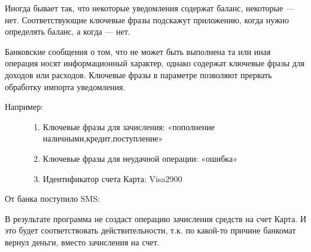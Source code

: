 \documentclass[a4paper,10pt,russian]{sphinxmanual}
\begin{document}
\noindent{}

\noindent{}

Иногда бывает так, что некоторые уведомления содержат баланс, некоторые — нет. Соответствующие ключевые фразы
подскажут приложению, когда нужно определять баланс, а когда — нет.

Банковские сообщения о том, что не может быть выполнена та или иная операция носят информационный характер,
однако содержат ключевые фразы для доходов или расходов. Ключевые фразы в параметре  позволяют
прервать обработку импорта уведомления.
\begin{description}
\item[{Например:}] \leavevmode\begin{enumerate}
\def\theenumi{\arabic{enumi}}
\def\labelenumi{\theenumi .}
\makeatletter\def\p@enumii{\p@enumi \theenumi .}\makeatother
\item {} 
Ключевые фразы для зачисления: «пополнение наличными,кредит,поступление»

\item {} 
Ключевые фразы для неудачной операции: «ошибка»

\item {} 
Идентификатор счета Карта: Visa2900

\end{enumerate}

\end{description}

От банка поступило SMS:

\begin{sphinxVerbatim}[commandchars=\\\{\}]
           
\end{sphinxVerbatim}

В результате программа не создаст операцию зачисления средств на счет Карта. И это будет соответствовать действительности,
т.к. по какой-то причине банкомат вернул деньги, вместо зачисления на счет.
\end{document}

